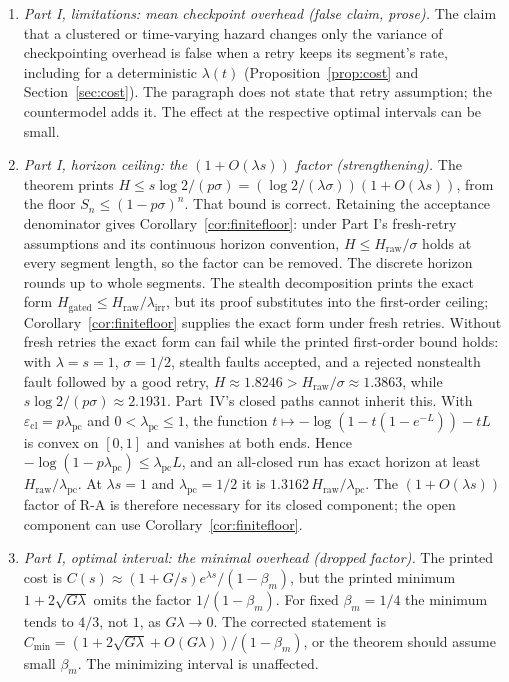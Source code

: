 \documentclass[11pt]{article}
\theoremstyle{definition}
\theoremstyle{remark}
\begin{document}
\begin{enumerate}[leftmargin=*,itemsep=2pt]
\item \emph{Part I, limitations: mean checkpoint overhead (false claim, prose).} The claim that a
clustered or time-varying hazard changes only the variance of checkpointing overhead is false
when a retry keeps its segment's rate, including for a deterministic $\lambda(t)$
(Proposition~\ref{prop:cost} and Section~\ref{sec:cost}). The paragraph does not state that
retry assumption; the countermodel adds it. The effect at the respective optimal intervals can be
small.

\item \emph{Part I, horizon ceiling: the $(1+O(\lambda s))$ factor (strengthening).} The theorem
prints $H\le s\log2/(p\sigma)=(\log2/(\lambda\sigma))(1+O(\lambda s))$, from the floor
$S_n\le(1-p\sigma)^n$. That bound is correct. Retaining the acceptance denominator gives
Corollary~\ref{cor:finitefloor}: under Part I's fresh-retry assumptions and its continuous
horizon convention, $H\le H_{\mathrm{raw}}/\sigma$ holds at every segment length, so the factor can
be removed. The discrete horizon rounds up to whole segments. The stealth decomposition prints
the exact form $H_{\mathrm{gated}}\le H_{\mathrm{raw}}/\lambda_{\mathrm{irr}}$, but its proof
substitutes into the first-order ceiling; Corollary~\ref{cor:finitefloor} supplies the exact form
under fresh retries. Without fresh retries the exact form can fail while the printed first-order
bound holds: with $\lambda=s=1$, $\sigma=1/2$, stealth faults accepted, and a rejected nonstealth
fault followed by a good retry, $H\approx1.8246>H_{\mathrm{raw}}/\sigma\approx1.3863$, while
$s\log2/(p\sigma)\approx2.1931$.
Part~IV's closed paths cannot inherit this. With $\varepsilon_{\mathrm{cl}}=p\lambda_{\mathrm{pc}}$
and $0<\lambda_{\mathrm{pc}}\le1$, the function $t\mapsto-\log(1-t(1-e^{-L}))-tL$ is convex on
$[0,1]$ and vanishes at both ends. Hence $-\log(1-p\lambda_{\mathrm{pc}})\le\lambda_{\mathrm{pc}}L$,
and an all-closed run has exact horizon at least $H_{\mathrm{raw}}/\lambda_{\mathrm{pc}}$. At
$\lambda s=1$ and $\lambda_{\mathrm{pc}}=1/2$ it is $1.3162\,H_{\mathrm{raw}}/\lambda_{\mathrm{pc}}$.
The $(1+O(\lambda s))$ factor of R-A is therefore necessary for its closed component; the open
component can use Corollary~\ref{cor:finitefloor}.

\item \emph{Part I, optimal interval: the minimal overhead (dropped factor).} The printed cost is
$C(s)\approx(1+G/s)e^{\lambda s}/(1-\beta_m)$, but the printed minimum $1+2\sqrt{G\lambda}$ omits
the factor $1/(1-\beta_m)$. For fixed $\beta_m=1/4$ the minimum tends to $4/3$, not $1$, as
$G\lambda\to0$. The corrected statement is
$C_{\min}=(1+2\sqrt{G\lambda}+O(G\lambda))/(1-\beta_m)$, or the theorem should assume small
$\beta_m$. The minimizing interval is unaffected.


\end{enumerate}
\end{document}
